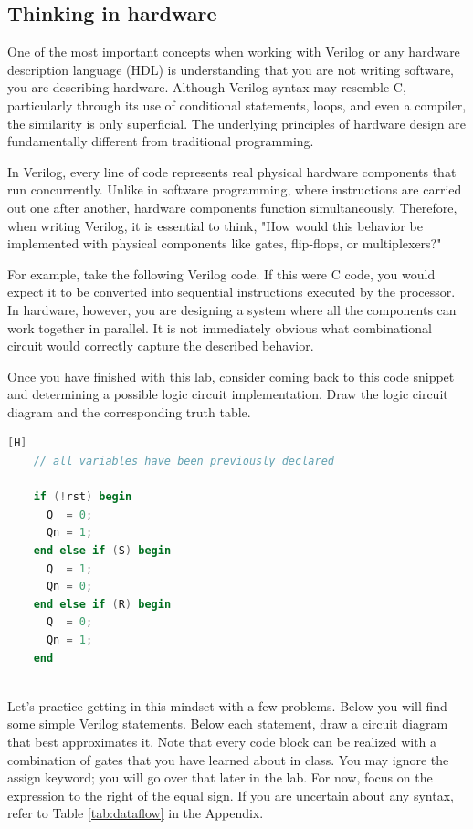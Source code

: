 \documentclass[12pt]{labmanual}
\begin{document}
\subsection{Thinking in hardware}
One of the most important concepts when working with Verilog or any hardware description language (HDL) is understanding that you are not writing software, you are describing hardware. Although Verilog syntax may resemble C, particularly through its use of conditional statements, loops, and even a compiler, the similarity is only superficial. The underlying principles of hardware design are fundamentally different from traditional programming.

In Verilog, every line of code represents real physical hardware components that run concurrently. Unlike in software programming, where instructions are carried out one after another, hardware components function simultaneously. Therefore, when writing Verilog, it is essential to think, "How would this behavior be implemented with physical components like gates, flip-flops, or multiplexers?"

For example, take the following Verilog code. If this were C code, you would expect it to be converted into sequential instructions executed by the processor. In hardware, however, you are designing a system where all the components can work together in parallel. It is not immediately obvious what combinational circuit would correctly capture the described behavior.

\begin{bonusquestion}
Once you have finished with this lab, consider coming back to this code snippet and determining a possible logic circuit implementation. Draw the logic circuit diagram and the corresponding truth table.
\end{bonusquestion}

\begin{lstlisting}[language=Verilog][H]
    // all variables have been previously declared
    
    if (!rst) begin
      Q  = 0;
      Qn = 1;
    end else if (S) begin
      Q  = 1;
      Qn = 0;
    end else if (R) begin
      Q  = 0;
      Qn = 1;
    end
    
\end{lstlisting}
\clearpage
\begin{question}[Practice]
    Let's practice getting in this mindset with a few problems. Below you will find some simple Verilog statements. Below each statement, draw a circuit diagram that best approximates it. Note that every code block can be realized with a combination of gates that you have learned about in class. You may ignore the assign keyword; you will go over that later in the lab. For now, focus on the expression to the right of the equal sign. If you are uncertain about any syntax, refer to Table \ref{tab:dataflow} in the Appendix.
\end{question}
\end{document}
